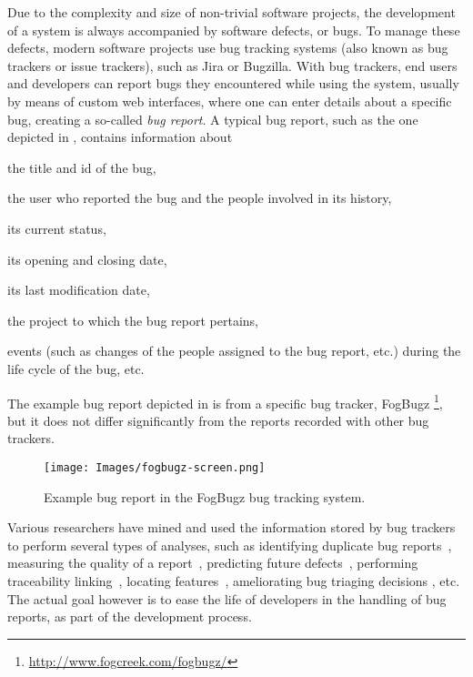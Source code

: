 Due to the complexity and size of non-trivial software projects, the development of a system is always accompanied by software defects, or bugs. To manage these defects, modern software projects use bug tracking systems (also known as bug trackers or issue trackers), such as Jira or Bugzilla. With bug trackers, end users and developers can report bugs they encountered while using the system, usually by means of custom web interfaces, where one can enter details about a specific bug, creating a so-called \emph{bug report}. A typical bug report, such as the one depicted in , contains information about \begin{inparaenum}[(1)] \item the title and id of the bug, \item the user who reported the bug and the people involved in its history, \item its current status, \item its opening and closing date, \item its last modification date, \item the project to which the bug report pertains, \item events (such as changes of the people assigned to the bug report, etc.) during the life cycle of the bug, etc. \end{inparaenum} The example bug report depicted in  is from a specific bug tracker, FogBugz \footnote{\url{http://www.fogcreek.com/fogbugz/}}, but it does not differ significantly from the reports recorded with other bug trackers.

\begin{figure}[ht]
\centering
\texttt{[image: Images/fogbugz-screen.png]}
\caption{Example bug report in the FogBugz bug tracking system.}
\label{fogbugz-example}
\end{figure}

Various researchers have mined and used the information stored by bug trackers to perform several types of analyses, such as identifying duplicate bug reports~\cite{Wang08a}, measuring the quality of a report~\cite{Bettenburg08}, predicting future defects~\cite{DAmb2012a}, performing traceability linking~\cite{Biss2013a}, locating features~\cite{Dit2013a}, ameliorating bug triaging decisions \cite{Anvi06a}, etc. The actual goal however is to ease the life of developers in the handling of bug reports, as part of the development process.

